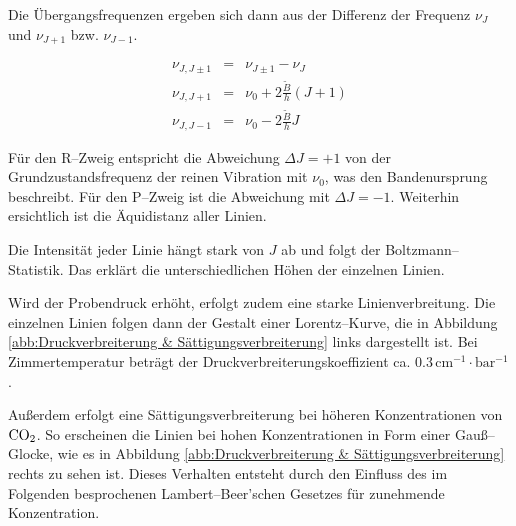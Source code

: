 \documentclass[12pt,a4paper]{scrartcl}
\numberwithin{equation}{section} %
\begin{document}
\noindent
Die Übergangsfrequenzen ergeben sich dann aus der Differenz der Frequenz $\nu_J$ und $\nu_{J+1}$ bzw. $\nu_{J-1}$.

\begin{eqnarray}
  \nu_{J, J\pm1} &=& \nu_{J\pm1} - \nu_J \\
  \nu_{J, J+1} &=& \nu_0 + 2 \frac{\tilde{B}}{h} (J+1) \\
  \nu_{J, J-1} &=& \nu_0 - 2 \frac{\tilde{B}}{h} J
\end{eqnarray}

\noindent
Für den R--Zweig entspricht die Abweichung $\Delta J = +1$ von der Grundzustandsfrequenz der reinen Vibration mit $\nu_0$, was den Bandenursprung beschreibt. Für den P--Zweig ist die Abweichung mit $\Delta J = -1$. Weiterhin ersichtlich ist die Äquidistanz aller Linien.

Die Intensität jeder Linie hängt stark von $J$ ab und folgt der Boltzmann--Statistik. Das erklärt die unterschiedlichen Höhen der einzelnen Linien.

Wird der Probendruck erhöht, erfolgt zudem eine starke Linienverbreitung. Die einzelnen Linien folgen dann der Gestalt einer Lorentz--Kurve, die in Abbildung \ref{abb:Druckverbreiterung & Sättigungsverbreiterung} links dargestellt ist. Bei Zimmertemperatur beträgt der Druckverbreiterungskoeffizient ca. $0.3 \mathrm{\, cm^{-1}\cdot bar^{-1}}$ \cite{UzK}.

Außerdem erfolgt eine Sättigungsverbreiterung bei höheren Konzentrationen von $\ce{CO_2}$. So erscheinen die Linien bei hohen Konzentrationen in Form einer Gauß--Glocke, wie es in Abbildung \ref{abb:Druckverbreiterung & Sättigungsverbreiterung} rechts zu sehen ist. Dieses Verhalten entsteht durch den Einfluss des im Folgenden besprochenen Lambert--Beer'schen Gesetzes für zunehmende Konzentration.
\end{document}
